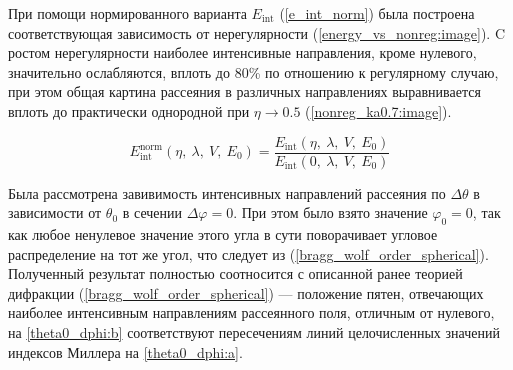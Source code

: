 
При помощи нормированного варианта $E_{\textrm{int}}$ (\ref{e_int_norm}) была построена соответствующая зависимость от нерегулярности (\autoref{energy_vs_nonreg:image}). C ростом нерегулярности наиболее интенсивные направления, кроме нулевого, значительно ослабляются, вплоть до 80\% по отношению к регулярному случаю, при этом общая картина рассеяния в различных направлениях выравнивается вплоть до практически однородной при $\eta \to 0.5$ (\autoref{nonreg_ka0.7:image}).

    \begin{equation}
        E_{\textrm{int}}^{\textrm{norm}} \left( \eta,\:\lambda, \:V, \:E_0 \right) = \frac{E_{\textrm{int}} \left( \eta,\:\lambda, \:V, \:E_0 \right)}{E_{\textrm{int}} \left( 0,\:\lambda, \:V, \:E_0 \right)}\label{e_int_norm}
    \end{equation}


Была рассмотрена завивимость интенсивных направлений рассеяния по $\Delta \theta$ в зависимости от $\theta_0$ в сечении $\Delta \varphi = 0$. При этом было взято значение $\varphi_0 = 0$, так как любое ненулевое значение этого угла в сути поворачивает угловое распределение на тот же угол, что следует из (\ref{bragg_wolf_order_spherical}). Полученный результат полностью соотносится с описанной ранее теорией дифракции (\ref{bragg_wolf_order_spherical}) --- положение пятен, отвечающих наиболее интенсивным направлениям рассеянного поля, отличным от нулевого, на \autoref{theta0_dphi:b} соответствуют пересечениям линий целочисленных значений индексов Миллера на \autoref{theta0_dphi:a}.

